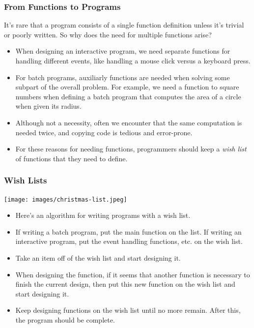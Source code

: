 \documentclass{beamer}
\begin{document}
\begin{frame}
  \frametitle{From Functions to Programs}
  It's rare that a program consists of a single function definition unless it's trivial or poorly written. So why does the need for multiple functions arise?
  \begin{itemize}
  \item<2-> When designing an interactive program, we need separate functions for handling different events, like handling a mouse click versus a keyboard press.
  \item<3-> For batch programs, auxiliarly functions are needed when solving some subpart of the overall problem. For example, we need a function to square numbers
    when defining a batch program that computes the area of a circle when given its radius.
  \item<4-> Although not a necessity, often we encounter that the same computation is needed twice, and copying code is tedious and error-prone.
  \item<5-> For these reasons for needing functions, programmers should keep a \emph{wish list} of functions that they need to define.
  \end{itemize}
  
\end{frame}

\begin{frame}
  \frametitle{Wish Lists}
  \begin{center}
    \texttt{[image: images/christmas-list.jpeg]}
  \end{center}
  \begin{itemize}
  \item<2-> Here's an algorithm for writing programs with a wish list.
  \item<3-> If writing a batch program, put the main function on the list. If writing an interactive program, put the event handling functions, etc. on the wish list.
  \item<4-> Take an item off of the wish list and start designing it.
  \item<5-> When designing the function, if it seems that another function is necessary to finish the current design, then put this new function on the wish list and
    start designing it.
  \item<6-> Keep designing functions on the wish list until no more remain. After this, the program should be complete.
  \end{itemize}
\end{frame}
\end{document}
